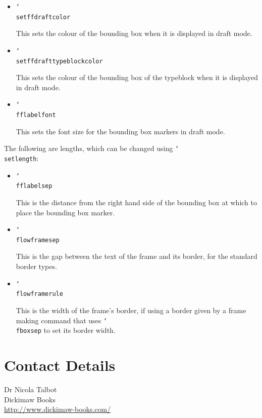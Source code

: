 \documentclass[a4paper,twoside]{report}
\newcommand{\cmdname}[1]{\texttt{\char`\\#1}}
\begin{document}
\begin{itemize}
\item \cmdname{setffdraftcolor} 

This sets the colour of the bounding box
when it is displayed in draft mode.

\item 
\cmdname{setffdrafttypeblockcolor} 

This sets the colour of
the bounding box of the typeblock when it is displayed
in draft mode.

\item \cmdname{fflabelfont}

This sets the font size for the bounding box markers in 
draft mode.

\end{itemize}

The following are lengths, which can be changed using
\cmdname{setlength}:

\begin{itemize}
\item \cmdname{fflabelsep}

This is the distance from the right hand side of the
bounding box at which to place the bounding box marker.

\item \cmdname{flowframesep}

This is the gap between the text of the frame and
its border, for the standard border types. 

\item \cmdname{flowframerule}

This is the width of the frame's border, if using
a border given by a frame making command that uses \cmdname{fboxsep}
to set its border width.
\end{itemize}


\chapter*{Contact Details}

Dr Nicola Talbot\\
Dickimaw Books\\
\url{http://www.dickimaw-books.com/}
\end{document}
